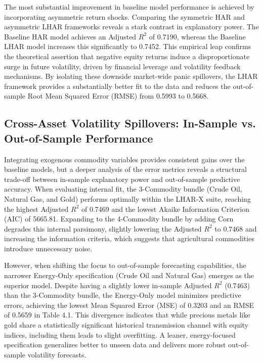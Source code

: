\documentclass{report}
\begin{document}
The most substantial improvement in baseline model performance is achieved by incorporating asymmetric return shocks. Comparing the symmetric HAR and asymmetric LHAR frameworks reveals a stark contrast in explanatory power. The Baseline HAR model achieves an Adjusted $R^2$ of 0.7190, whereas the Baseline LHAR model increases this significantly to 0.7452. This empirical leap confirms the theoretical assertion that negative equity returns induce a disproportionate surge in future volatility, driven by financial leverage and volatility feedback mechanisms. By isolating these downside market-wide panic spillovers, the LHAR framework provides a substantially better fit to the data and reduces the out-of-sample Root Mean Squared Error (RMSE) from 0.5993 to 0.5668.

\subsection{Cross-Asset Volatility Spillovers: In-Sample vs. Out-of-Sample Performance}

Integrating exogenous commodity variables provides consistent gains over the baseline models, but a deeper analysis of the error metrics reveals a structural trade-off between in-sample explanatory power and out-of-sample predictive accuracy. When evaluating internal fit, the 3-Commodity bundle (Crude Oil, Natural Gas, and Gold) performs optimally within the LHAR-X suite, reaching the highest Adjusted $R^2$ of 0.7469 and the lowest Akaike Information Criterion (AIC) of 5665.81. Expanding to the 4-Commodity bundle by adding Corn degrades this internal parsimony, slightly lowering the Adjusted $R^2$ to 0.7468 and increasing the information criteria, which suggests that agricultural commodities introduce unnecessary noise.

However, when shifting the focus to out-of-sample forecasting capabilities, the narrower Energy-Only specification (Crude Oil and Natural Gas) emerges as the superior model. Despite having a slightly lower in-sample Adjusted $R^2$ (0.7463) than the 3-Commodity bundle, the Energy-Only model minimizes predictive errors, achieving the lowest Mean Squared Error (MSE) of 0.3203 and an RMSE of 0.5659 in Table 4.1. This divergence indicates that while precious metals like gold share a statistically significant historical transmission channel with equity indices, including them leads to slight overfitting. A leaner, energy-focused specification generalizes better to unseen data and delivers more robust out-of-sample volatility forecasts.
\end{document}

